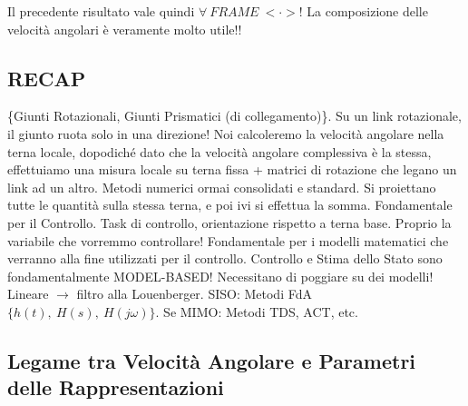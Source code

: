 Il precedente risultato vale quindi $\forall\ FRAME\ <\mathord{\cdot}>$! La composizione delle velocità angolari è veramente molto utile!! 

\subsection{RECAP}

\{Giunti Rotazionali, Giunti Prismatici (di collegamento)\}. Su un link rotazionale, il giunto ruota solo in una direzione! Noi calcoleremo la velocità angolare nella terna locale, dopodiché dato che la velocità angolare complessiva è la stessa, effettuiamo una misura locale su terna fissa + matrici di rotazione che legano un link ad un altro. Metodi numerici ormai consolidati e standard. Si proiettano tutte le quantità sulla stessa terna, e poi ivi si effettua la somma. Fondamentale per il Controllo. Task di controllo, orientazione rispetto a terna base. Proprio la variabile che vorremmo controllare! Fondamentale per i modelli matematici che verranno alla fine utilizzati per il controllo. Controllo e Stima dello Stato sono fondamentalmente MODEL-BASED! Necessitano di poggiare su dei modelli! Lineare $\rightarrow$ filtro alla Louenberger. SISO: Metodi FdA $\{h(t),\ H(s),\ H(j\omega)\}$. Se MIMO: Metodi TDS, ACT, etc.

\subsection{Legame tra Velocità Angolare e Parametri delle Rappresentazioni}


